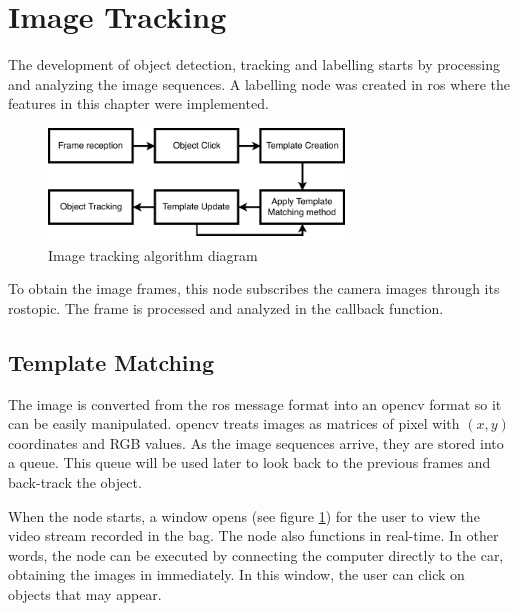 \section{Image Tracking}

The development of object detection, tracking and labelling starts by processing and analyzing the image sequences. A labelling node was created in \gls{ros} where the features in this chapter were implemented. 

\begin{figure}[htp]
	
	\centering
	\includegraphics[width=0.7\textwidth]{caplabel/imgs/templatediagram.pdf}
	
	\caption{Image tracking algorithm diagram}
	\label{fig:view}
	
\end{figure}

To obtain the image frames, this node subscribes the camera images through its rostopic. The frame is processed and analyzed in the callback function.

\subsection{Template Matching}

The image is converted from the \gls{ros} message format into an \gls{opencv} format so it can be easily manipulated. \gls{opencv} treats images as matrices of pixel with $(x,y)$ coordinates and RGB values. As the image sequences arrive, they are stored into a queue. This queue will be used later to look back to the previous frames and back-track the object. 

When the node starts, a window opens (see figure \ref{fig:view}) for the user to view the video stream recorded in the bag. The node also functions in real-time. In other words, the node can be executed by connecting the computer directly to the car, obtaining the images in immediately. In this window, the user can click on objects that may appear. 


